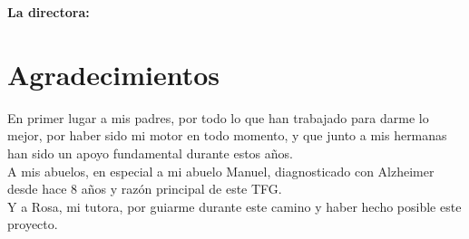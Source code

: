 \vspace{1cm}

\textbf{La directora:}

\vspace{5cm}

\noindent \textbf{\myProf}

\chapter*{Agradecimientos}
\thispagestyle{empty}

       \vspace{1cm}

En primer lugar a mis padres, por todo lo que han trabajado para darme lo mejor, por haber sido mi motor en todo momento,
y que junto a mis hermanas han sido un apoyo fundamental durante estos años. \\

A mis abuelos, en especial a mi abuelo Manuel, diagnosticado con Alzheimer desde hace 8 años y razón principal de este
TFG. \\

Y a Rosa, mi tutora, por guiarme durante este camino y haber hecho posible este proyecto. \\


